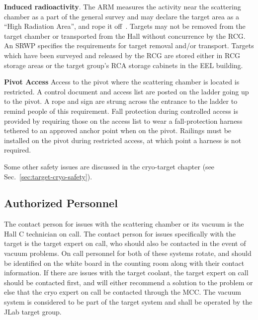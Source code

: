{\begin{safetyen}{0}{0}
\begin{list}{.~}{\setlength{\itemsep}{-0.15cm}}
  \item {\bf Induced radioactivity}. The ARM  measures the activity near the scattering chamber as a part of the general survey and may declare the target area 
        as a ``High Radiation Area'', and rope it off~\cite{RWIcebaf}. 
        Targets may not be removed from the target chamber or transported from the Hall without 
        concurrence by the RCG. An SRWP specifies the requirements for target removal and/or 
        transport. Targets which have been surveyed and released by the RCG are stored either in RCG storage areas or the target group's RCA storage cabinets in the EEL building.
        
\item {\bf Pivot Access} Access to the pivot where the scattering chamber is located is restricted. A control document and access list are posted on the ladder going up to the pivot. A rope and sign are strung across the entrance to the ladder to remind people of this requirement. Fall protection during controlled access is provided by requiring those on the access list to wear a fall-protection harness tethered to an approved anchor point when on the pivot. Railings must be installed on the pivot during restricted access, at which point a harness is not required.

\end{list}

Some other safety issues are discussed in the cryo-target chapter 
(see Sec.~\ref{sec:target-cryo-safety}).

\subsection[Authorized  Personnel]{Authorized  Personnel}

The contact person for issues with the scattering chamber or its vacuum is the Hall C technician on call. The contact person for issues specifically with the target is the target expert on call, who should also be contacted in the event of vacuum problems.  On call personnel for both of these systems rotate, and should be identified on the white board in the counting room along with their contact information.
If there are issues with the target coolant, the target expert on call should be contacted first, and will either recommend a solution to the problem or else that the cryo expert on call be contacted through the MCC. The vacuum system is considered to be part of the target system and shall be operated by the JLab target group.
\end{safetyen}
}
%

